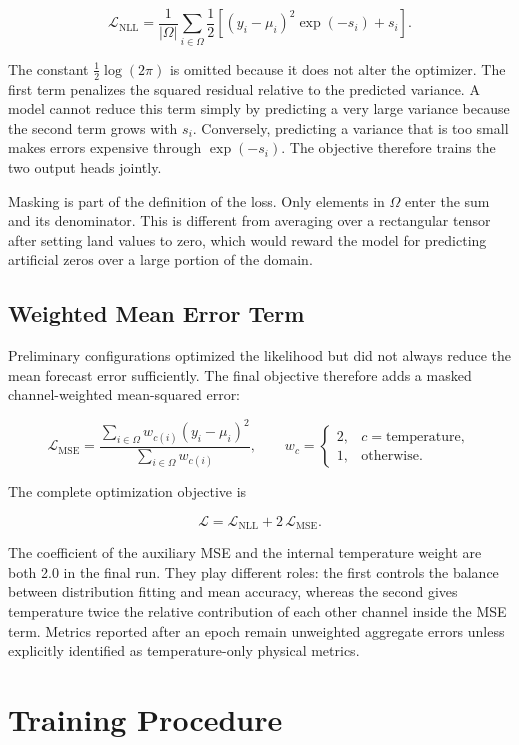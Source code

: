 \[
\mathcal{L}_{\mathrm{NLL}}
=\frac{1}{|\Omega|}\sum_{i\in\Omega}
\frac{1}{2}\left[(y_i-\mu_i)^2\exp(-s_i)+s_i\right].
\]

The constant $\tfrac{1}{2}\log(2\pi)$ is omitted because it does not alter the optimizer. The first term penalizes the squared residual relative to the predicted variance. A model cannot reduce this term simply by predicting a very large variance because the second term grows with $s_i$. Conversely, predicting a variance that is too small makes errors expensive through $\exp(-s_i)$. The objective therefore trains the two output heads jointly.

Masking is part of the definition of the loss. Only elements in $\Omega$ enter the sum and its denominator. This is different from averaging over a rectangular tensor after setting land values to zero, which would reward the model for predicting artificial zeros over a large portion of the domain.

\subsection{Weighted Mean Error Term}

Preliminary configurations optimized the likelihood but did not always reduce the mean forecast error sufficiently. The final objective therefore adds a masked channel-weighted mean-squared error:

\[
\mathcal{L}_{\mathrm{MSE}}
=
\frac{
\sum_{i\in\Omega} w_{c(i)}(y_i-\mu_i)^2
}{
\sum_{i\in\Omega} w_{c(i)}
},
\qquad
w_c=
\begin{cases}
2,& c=\text{temperature},\\
1,& \text{otherwise}.
\end{cases}
\]

The complete optimization objective is

\[
\mathcal{L}=\mathcal{L}_{\mathrm{NLL}}+2\,\mathcal{L}_{\mathrm{MSE}}.
\]

The coefficient of the auxiliary MSE and the internal temperature weight are both 2.0 in the final run. They play different roles: the first controls the balance between distribution fitting and mean accuracy, whereas the second gives temperature twice the relative contribution of each other channel inside the MSE term. Metrics reported after an epoch remain unweighted aggregate errors unless explicitly identified as temperature-only physical metrics.

\section{Training Procedure}

